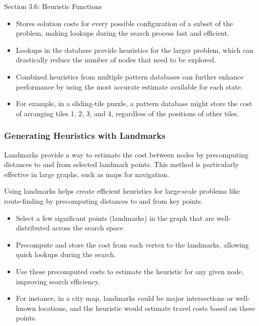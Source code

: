\begin{notes}{Section 3.6: Heuristic Functions}
\begin{highlight}
    \begin{itemize}
        \item Stores solution costs for every possible configuration of a subset of the problem, making lookups during the search process fast and efficient.
        \item Lookups in the database provide heuristics for the larger problem, which can drastically reduce the number of nodes that need to be explored.
        \item Combined heuristics from multiple pattern databases can further enhance performance by using the most accurate estimate available for each state.
        \item For example, in a sliding-tile puzzle, a pattern database might store the cost of arranging tiles 1, 2, 3, and 4, regardless of the positions of other tiles.
    \end{itemize}
    
    \end{highlight}
    
    \subsubsection*{Generating Heuristics with Landmarks}
    
    Landmarks provide a way to estimate the cost between nodes by precomputing distances to and from selected landmark points. This method is particularly effective in large graphs, such as maps for navigation.
    
    \begin{highlight}[Landmarks]
    
    Using landmarks helps create efficient heuristics for large-scale problems like route-finding by precomputing distances to and from key points.
    
    \begin{itemize}
        \item Select a few significant points (landmarks) in the graph that are well-distributed across the search space.
        \item Precompute and store the cost from each vertex to the landmarks, allowing quick lookups during the search.
        \item Use these precomputed costs to estimate the heuristic for any given node, improving search efficiency.
        \item For instance, in a city map, landmarks could be major intersections or well-known locations, and the heuristic would estimate travel costs based on these points.
    \end{itemize}
    

\end{highlight}
\end{notes}
